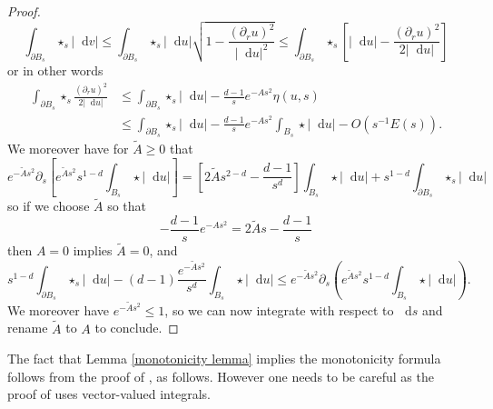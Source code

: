 \documentclass[reqno,10pt]{amsart}
\newcommand*\dif{\mathop{}\!\mathrm{d}}
\theoremstyle{definition}
\numberwithin{equation}{section}
\begin{document}
\begin{proof}
$$\int_{\partial B_s} \star_s |\dif v| \leq \int_{\partial B_s} \star_s |\dif u| \sqrt{1 - \frac{(\partial_r u)^2}{|\dif u|^2}} \leq \int_{\partial B_s} \star_s \left[|\dif u| - \frac{(\partial_r u)^2}{2 |\dif u|}\right]$$
or in other words
\begin{align*}
\int_{\partial B_s} \star_s \frac{(\partial_r u)^2}{2|\dif u|} &\leq \int_{\partial B_s} \star_s |\dif u| - \frac{d - 1}{s} e^{-As^2} \eta(u, s)\\
&\leq \int_{\partial B_s} \star_s |\dif u| - \frac{d - 1}{s} e^{-As^2} \int_{B_s} \star |\dif u| - O(s^{-1}E(s)).
\end{align*}
We moreover have for $\tilde A \geq 0$ that
$$e^{-\tilde As^2} \partial_s \left[e^{\tilde As^2} s^{1 - d} \int_{B_s} \star |\dif u|\right] = \left[2\tilde As^{2 - d} - \frac{d - 1}{s^d}\right]\int_{B_s} \star |\dif u| + s^{1 - d} \int_{\partial B_s} \star_s |\dif u|$$
so if we choose $\tilde A$ so that
$$-\frac{d - 1}{s} e^{-As^2} = 2\tilde As - \frac{d - 1}{s}$$
then $A = 0$ implies $\tilde A = 0$, and
$$s^{1 - d} \int_{\partial B_s} \star_s |\dif u| - (d - 1)\frac{e^{-\tilde As^2}}{s^d} \int_{B_s} \star|\dif u| \leq e^{-\tilde As^2} \partial_s\left(e^{\tilde As^2} s^{1 - d} \int_{B_s} \star|\dif u|\right).$$
We moreover have $e^{-\tilde As^2} \leq 1$, so we can now integrate with respect to $\dif s$ and rename $\tilde A$ to $A$ to conclude.
\end{proof}

The fact that Lemma \ref{monotonicity lemma} implies the monotonicity formula follows from the proof of \cite[Proposition 5.12]{Giusti77}, as follows.
However one needs to be careful as the proof of \cite{Giusti77} uses vector-valued integrals.
\end{document}

